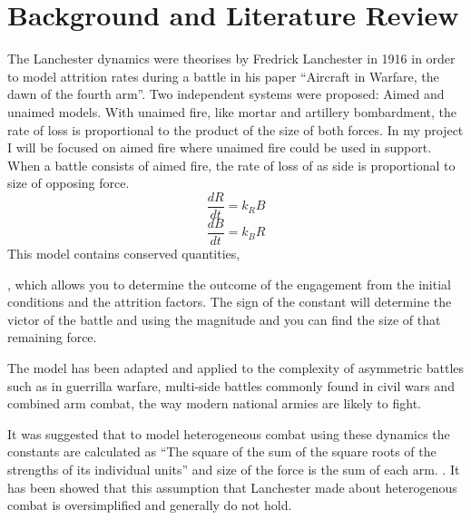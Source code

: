 \chapter{Background and Literature Review} \label{Chapter:one}
The Lanchester dynamics were theorises by Fredrick Lanchester in 1916 in order to model attrition rates during a battle in his paper “Aircraft in Warfare, the dawn of the fourth arm”. \cite{lanchester1995aircraft} Two independent systems were proposed: Aimed and unaimed models. With unaimed fire, like mortar and artillery bombardment, the rate of loss is proportional to the product of the size of both forces. In my project I will be focused on aimed fire where unaimed fire could be used in support. When a battle consists of aimed fire, the rate of loss of as side is proportional to size of opposing force. 
\[ \frac{dR}{dt} = k_R B\]
\[ \frac{dB}{dt} = k_B R\]
 This model contains conserved quantities,
    
, which allows you to determine the outcome of the engagement from the initial conditions and the attrition factors. The sign of the constant will determine the victor of the battle and using the magnitude and you can find the size of that remaining force. 

 The model has been adapted and applied to the complexity of asymmetric battles such as in guerrilla warfare, multi-side battles commonly found in civil wars and combined arm combat, the way modern national armies are likely to fight.

It was suggested that to model heterogeneous combat using these dynamics the constants are calculated as “The square of the sum of the square roots of the strengths of its individual units” and size of the force is the sum of each arm. \cite{lanchester1995aircraft}. It has been showed that this assumption that Lanchester made about heterogenous combat is oversimplified and generally do not hold. \cite{Lin2014}

